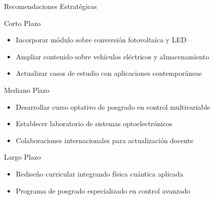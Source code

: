 \documentclass[aspectratio=43]{beamer}
\begin{document}
  \begin{frame}{Recomendaciones Estratégicas}
  \begin{block}{Corto Plazo}
  \begin{itemize}
    \small
  \item Incorporar módulo sobre conversión fotovoltaica y LED
  \item Ampliar contenido sobre vehículos eléctricos y almacenamiento
  \item Actualizar casos de estudio con aplicaciones contemporáneas
  \end{itemize}
  \end{block}

  \vspace{-0.3cm}

  \begin{block}{Mediano Plazo}
  \begin{itemize}
    \small
  \item Desarrollar curso optativo de posgrado en control multivariable
  \item Establecer laboratorio de sistemas optoelectrónicos
  \item Colaboraciones internacionales para actualización docente
  \end{itemize}
  \end{block}
  
  \vspace{-0.3cm}

  \begin{block}{Largo Plazo}
  \begin{itemize}
    \small
  \item Rediseño curricular integrando física cuántica aplicada
  \item Programa de posgrado especializado en control avanzado
  \end{itemize}
  \end{block}
  
  \end{frame}
  
\end{document}
